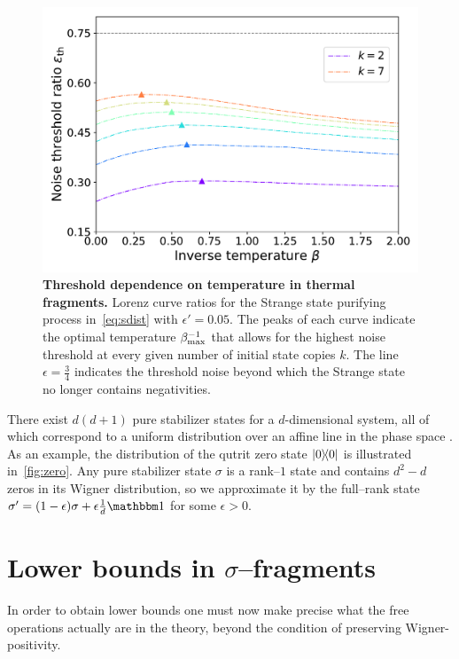 \documentclass[pra,
aps,
twocolumn,
superscriptaddress,
groupedaddress,
nofootinbib,
reprint
]{revtex4-1}
\begin{document}
\begin{figure}[h]
    \centering
    \includegraphics[scale=0.5]{figs/thermal_distill.pdf}
    \caption{\textbf{Threshold dependence on temperature in thermal fragments.} Lorenz curve ratios for the Strange state purifying process in~\cref{eq:sdist} with $\epsilon' = 0.05$.
    The peaks of each curve indicate the optimal temperature $\beta_{\rm{max}}^{-1}$ that allows for the highest noise threshold at every given number of initial state copies $k$.
    The line $\epsilon = \frac{3}{4}$ indicates the threshold noise beyond which the Strange state no longer contains negativities.
    }
    \label{fig:thermal_distill}
\end{figure}

There exist $d(d+1)$ pure stabilizer states for a $d$-dimensional system, all of which correspond to a uniform distribution over an affine line in the phase space .
As an example, the distribution of the qutrit zero state $\ketbra{0}$ is illustrated in~\cref{fig:zero}.
Any pure stabilizer state $\sigma$ is a rank--$1$ state and contains $d^2 - d$ zeros in its Wigner distribution, so we approximate it by the full--rank state $\sigma' = (1-\epsilon)\sigma + \epsilon \frac{1}{d}\id$ for some $\epsilon > 0$.

\null\newpage
\section{Lower bounds in $\sigma$--fragments}

In order to obtain lower bounds one must now make precise what the free operations actually are in the  theory, beyond the condition of preserving Wigner-positivity.
\end{document}
